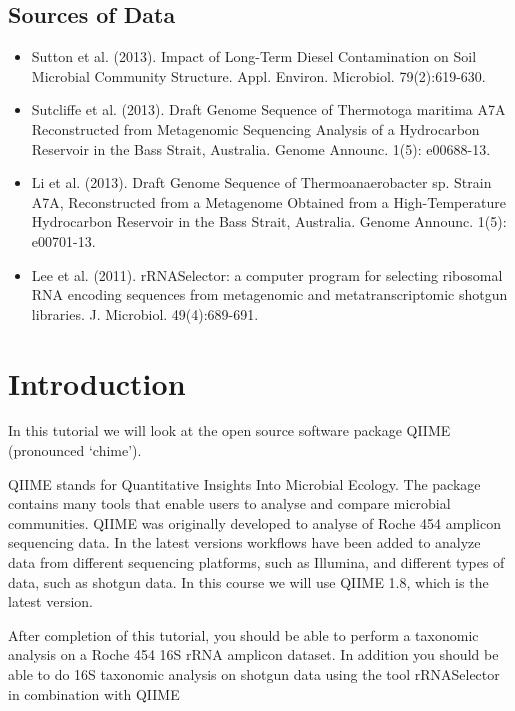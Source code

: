 \subsection{Sources of Data}
\begin{itemize}
  \item Sutton et al. (2013). Impact of Long-Term Diesel Contamination on Soil Microbial Community Structure. Appl. Environ. Microbiol. 79(2):619-630.
  \item Sutcliffe et al. (2013). Draft Genome Sequence of Thermotoga maritima A7A Reconstructed from Metagenomic Sequencing Analysis of a Hydrocarbon Reservoir in the Bass Strait, Australia. Genome Announc. 1(5): e00688-13.
  \item Li et al. (2013). Draft Genome Sequence of Thermoanaerobacter sp. Strain A7A, Reconstructed from a Metagenome Obtained from a High-Temperature Hydrocarbon Reservoir in the Bass Strait, Australia. Genome Announc. 1(5): e00701-13.
  \item Lee et al. (2011). rRNASelector: a computer program for selecting ribosomal RNA encoding sequences from metagenomic and metatranscriptomic shotgun libraries. J. Microbiol. 49(4):689-691.
\end{itemize}


\newpage


\section{Introduction}

\begin{note}
In this tutorial we will look at the open source software package QIIME (pronounced ‘chime’).
\end{note}

QIIME stands for Quantitative Insights Into Microbial Ecology. The package contains many tools that enable users to analyse and compare microbial communities. QIIME was originally developed to analyse of Roche 454 amplicon sequencing data. In the latest versions workflows have been added to analyze data from different sequencing platforms, such as Illumina, and different types of data, such as shotgun data. In this course we will use QIIME 1.8, which is the latest version.

After completion of this tutorial, you should be able to perform a taxonomic analysis on a Roche 454 16S rRNA amplicon dataset. In addition you should be able to do 16S taxonomic analysis on shotgun data using the tool rRNASelector in combination with QIIME

